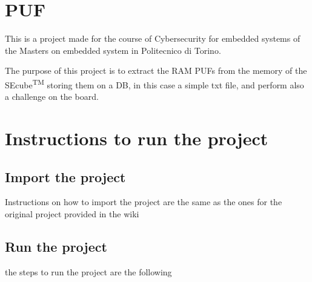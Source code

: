 \section {PUF}
This is a project made for the course of Cybersecurity for embedded systems of the Masters on embedded system in Politecnico di Torino.

The purpose of this project is to extract the RAM PUFs from the memory of the SEcube\textsuperscript{TM} storing them on a DB, in this case a simple txt file, and perform also a challenge on the board.

\section {Instructions to run the project}

\subsection {Import the project}
Instructions on how to import the project are the same as the ones for the original project provided in the wiki

\subsection {Run the project}
the steps to run the project are the following


